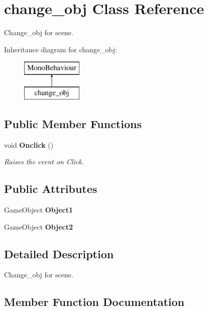 \section{change\+\_\+obj Class Reference}
\label{classchange__obj}


Change\+\_\+obj for scene.  


Inheritance diagram for change\+\_\+obj\+:\begin{figure}[H]
\begin{center}
\leavevmode
\includegraphics[height=2.000000cm]{classchange__obj}
\end{center}
\end{figure}
\subsection*{Public Member Functions}
\begin{DoxyCompactItemize}
\item 
void {\bf Onclick} ()
\begin{DoxyCompactList}\small\item\em Raises the event on Click. \end{DoxyCompactList}\end{DoxyCompactItemize}
\subsection*{Public Attributes}
\begin{DoxyCompactItemize}
\item 
Game\+Object {\bf Object1}
\item 
Game\+Object {\bf Object2}
\end{DoxyCompactItemize}


\subsection{Detailed Description}
Change\+\_\+obj for scene. 



\subsection{Member Function Documentation}
